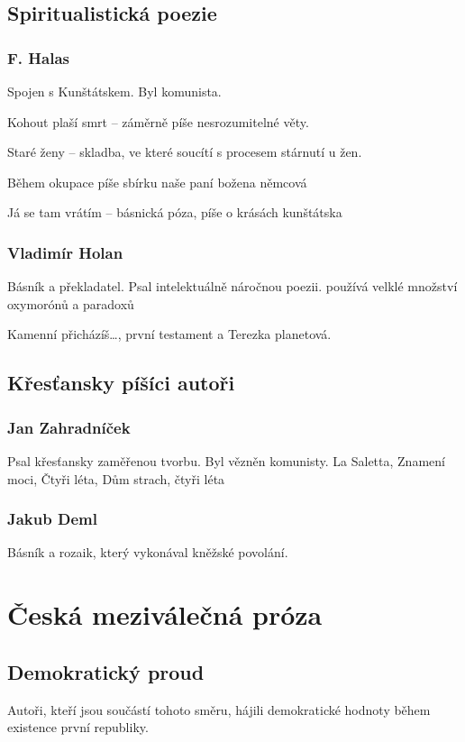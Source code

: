 \documentclass[10pt,a4page,headings,openany,%
oneside
,twocolumn
]{report}
\begin{document}
\section{Spiritualistická poezie}
\subsection{F. Halas}
Spojen s Kunštátskem. Byl komunista.

Kohout plaší smrt -- záměrně píše nesrozumitelné věty.

Staré ženy -- skladba, ve které soucítí s procesem stárnutí u žen.

Během okupace píše sbírku naše paní božena němcová

Já se tam vrátím -- básnická póza, píše o krásách kunštátska

\subsection{Vladimír Holan}
Básník a překladatel. Psal intelektuálně náročnou poezii. používá velklé množství oxymorónů a paradoxů

Kamenní přicházíš\dots, první testament a Terezka planetová.

\section{Křesťansky píšíci autoři}

\subsection{Jan Zahradníček}
Psal křesťansky zaměřenou tvorbu. Byl vězněn komunisty.
La Saletta, Znamení moci, Čtyři léta, Dům strach, čtyři léta



\subsection{Jakub Deml}
Básník a rozaik, který vykonával kněžské povolání.

\chapter{Česká meziválečná próza}
\section{Demokratický proud}
Autoři, kteří jsou součástí tohoto směru, hájili demokratické hodnoty během existence první republiky.
\end{document}
